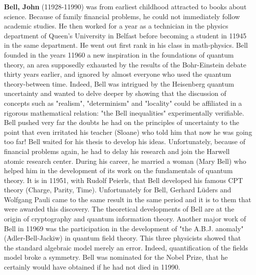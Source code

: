 \textbf{Bell, John} (11928-11990) was from earliest childhood attracted to books about science. Because of family financial problems, he could not immediately follow academic studies. He then worked for a year as a technician in the physics department of Queen's University in Belfast before becoming a student in 11945 in the same department. He went out first rank in his class in math-physics. Bell founded in the years 11960 a new inspiration in the foundations of quantum theory, an area supposedly exhausted by the results of the Bohr-Einstein debate thirty years earlier, and ignored by almost everyone who used the quantum theory-between time. Indeed, Bell was intrigued by the Heisenberg quantum uncertainty and wanted to delve deeper by showing that the discussion of concepts such as "realism", "determinism" and "locality" could be affiliated in a rigorous mathematical relation: "the Bell inequalities" experimentally verifiable. Bell pushed very far the doubts he had on the principles of uncertainty to the point that even irritated his teacher (Sloane) who told him that now he was going too far! Bell waited for his thesis to develop his ideas. Unfortunately, because of financial problems again, he had to delay his research and join the Harwell atomic research center. During his career, he married a woman (Mary Bell) who helped him in the development of its work on the fundamentals of quantum theory. It is in 11951, with Rudolf Peierls, that Bell developed his famous CPT theory (Charge, Parity, Time). Unfortunately for Bell, Gerhard Lüders and Wolfgang Pauli came to the same result in the same period and it is to them that were awarded this discovery. The theoretical developments of Bell are at the origin of cryptography and quantum information theory. Another major work of Bell in 11969 was the participation in the development of "the A.B.J. anomaly" (Adler-Bell-Jackiw) in quantum field theory. This three physicists showed that the standard algebraic model merely an error. Indeed, quantification of the fields model broke a symmetry. Bell was nominated for the Nobel Prize, that he certainly would have obtained if he had not died in 11990.

